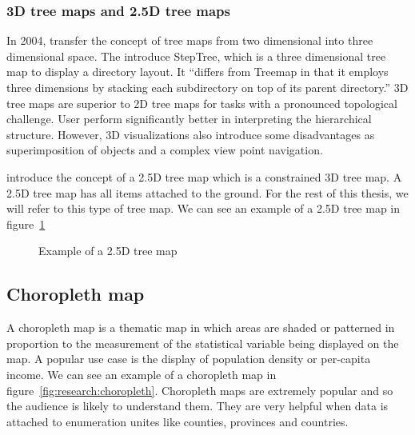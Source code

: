 \documentclass{article}
\newcommand{\tmap}{\textsc{2.5D} tree map}
\newcommand{\tmaps}{\textsc{2.5D} tree maps}
\newcommand{\threedTmap}{\textsc{3D} tree map}
\newcommand{\threedTmaps}{\textsc{3D} tree maps}
\begin{document}
\subsubsection{\threedTmaps{} and \tmaps}

In 2004, \textcite{Bladh2004} transfer the concept of tree maps from two dimensional into three dimensional space.
The introduce StepTree, which is a three dimensional tree map to display a directory layout.
It ``differs from Treemap in that it employs three dimensions by stacking each subdirectory on top of its parent directory.''\cite{Bladh2004}
3D tree maps are superior to 2D tree maps for tasks with a pronounced topological challenge.
User perform significantly better in interpreting the hierarchical structure.
However, 3D visualizations also introduce some disadvantages as superimposition of objects and a complex view point navigation.

\textcite{Limberger2016} introduce the concept of a \tmap{} which is a constrained \threedTmap{}.
A \tmap{} has all items attached to the ground.
For the rest of this thesis, we will refer to this type of tree map.
We can see an example of a \tmap{} in figure~\ref{fig:research:ua_treemap}

\begin{figure}[h]
  \centering
  \caption{Example of a \tmap{}}
  \label{fig:research:ua_treemap}
\end{figure}


\subsection{Choropleth map}
A choropleth map is a thematic map in which areas are shaded or patterned in proportion to the measurement of the statistical variable being displayed on the map.
A popular use case is the display of population density or per-capita income.
We can see an example of a choropleth map in figure~\ref{fig:research:choropleth}.
Choropleth maps are extremely popular and so the audience is likely to understand them.
They are very helpful when data is attached to enumeration unites like counties, provinces and countries.
\end{document}
